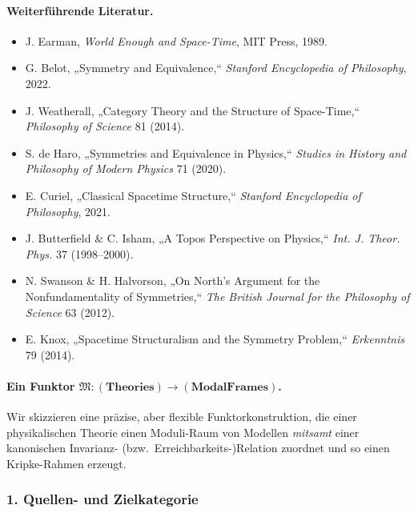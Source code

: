 \documentclass[10pt, letterpaper]{article}
\begin{document}
\bigskip

\paragraph{Weiterführende Literatur.}
\begin{itemize}
\item J. Earman, \emph{World Enough and Space-Time}, MIT Press, 1989.
\item G. Belot, „Symmetry and Equivalence,“ \emph{Stanford Encyclopedia of Philosophy}, 2022.
\item J. Weatherall, „Category Theory and the Structure of Space-Time,“
      \emph{Philosophy of Science} 81 (2014).
\item S. de Haro, „Symmetries and Equivalence in Physics,“
      \emph{Studies in History and Philosophy of Modern Physics} 71 (2020).
\item E. Curiel, „Classical Spacetime Structure,“
      \emph{Stanford Encyclopedia of Philosophy}, 2021.
\item J. Butterfield \& C. Isham, „A Topos Perspective on Physics,“
      \emph{Int. J. Theor. Phys.} 37 (1998–2000).
\item N. Swanson \& H. Halvorson, „On North’s Argument for the Nonfundamentality of Symmetries,“
      \emph{The British Journal for the Philosophy of Science} 63 (2012).
\item E. Knox, „Spacetime Structuralism and the Symmetry Problem,“
      \emph{Erkenntnis} 79 (2014).
\end{itemize}


\paragraph{Ein Funktor $\mathfrak{M}:(\mathbf{Theories})\to(\mathbf{ModalFrames})$.}
Wir skizzieren eine präzise, aber flexible Funktorkonstruktion, die einer physikalischen
Theorie einen Moduli-Raum von Modellen \emph{mitsamt} einer kanonischen Invarianz- (bzw.\ 
Erreichbarkeits-)Relation zuordnet und so einen Kripke-Rahmen erzeugt.

\subsubsection*{1. Quellen- und Zielkategorie}
\end{document}
